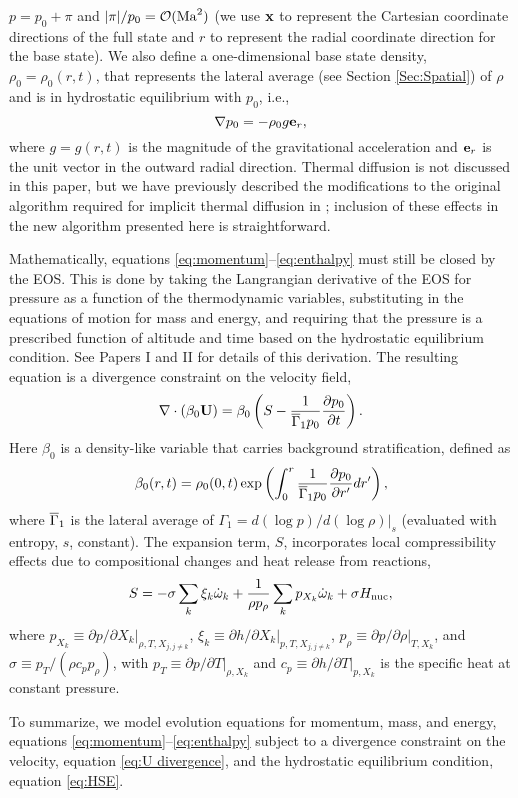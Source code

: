 $p = p_0 + \pi$ and $|\pi|/p_0 = \mathcal{O}({\rm Ma}^2)$ (we use ${\bf{x}}$ to represent the Cartesian coordinate 
directions of the full state and $r$ to represent the radial coordinate direction for 
the base state).  We also define a one-dimensional base state density, $\rho_0 = \rho_0(r,t)$, that represents the lateral average (see Section \ref{Sec:Spatial}) of $\rho$ and is in hydrostatic equilibrium with $p_0$, i.e., 
\begin{equation}
\nabla p_0 = -\rho_0 g\eb_r, \label{eq:HSE}
\end{equation}
where $g=g(r,t)$ is the magnitude of the gravitational acceleration and ${\bf{e}}_r$ is the unit vector in the outward radial direction. 
Thermal diffusion is not discussed in this paper, but we have previously described the modifications to the original algorithm required 
for implicit thermal diffusion in \cite{XRB_I}; inclusion of these effects in the new algorithm presented here is straightforward.

Mathematically, equations \ref{eq:momentum}--\ref{eq:enthalpy} must still be closed by the EOS.  
This is done by taking the Langrangian derivative of the EOS for pressure as a function of the thermodynamic variables, 
substituting in the equations of motion for mass and energy,
and requiring that the pressure is a prescribed function of altitude and time based on the hydrostatic equilibrium condition.
See Papers I and II for details of this derivation.
The resulting equation is a divergence constraint on the velocity field,
\begin{equation}
\nabla\cdot(\beta_0\Ub) = \beta_0\left(S - \frac{1}{\gammaonebar p_0}\frac{\partial p_0}{\partial t}\right).\label{eq:U divergence}
\end{equation}
Here $\beta_0$ is a density-like variable that carries background stratification, defined as
\begin{equation}
\beta_0(r,t) = \rho_0(0,t)\exp\left(\int_0^r\frac{1}{\gammaonebar p_0}\frac{\partial p_0}{\partial r'}dr'\right),
\end{equation}
where $\overline{\Gamma}_1$ is the lateral average of $\Gamma_1 = d(\log p)/d(\log\rho) |_s$ (evaluated with entropy, $s$, constant).
The expansion term, $S$, incorporates local compressibility effects due to compositional changes and heat release from reactions,
\begin{equation}
S = -\sigma\sum_k\xi_k\omegadot_k + \frac{1}{\rho p_\rho}\sum_k p_{X_k}\omegadot_k + \sigma\Hnuc,\label{eq:S}
\end{equation}
where 
$p_{X_k} \equiv \left. \partial p / \partial X_k \right|_{\rho,T,X_{j,j\ne k}}$, 
$\xi_k \equiv \left. \partial h /\partial X_k \right |_{p,T,X_{j,j\ne k}}$,
$p_\rho \equiv \left.\partial p/\partial \rho \right |_{T, X_k}$, and 
$\sigma \equiv p_T/(\rho c_p p_\rho)$, with $p_T \equiv \left. \partial p / \partial
T \right|_{\rho, X_k}$ and $c_p \equiv \left.  \partial h / \partial T
\right|_{p,X_k}$ is the specific heat at constant pressure.

To summarize, we model evolution equations for momentum, mass, and energy, equations \ref{eq:momentum}--\ref{eq:enthalpy} subject to a divergence constraint on the velocity, equation \ref{eq:U divergence}, and the hydrostatic equilibrium condition, equation \ref{eq:HSE}.
